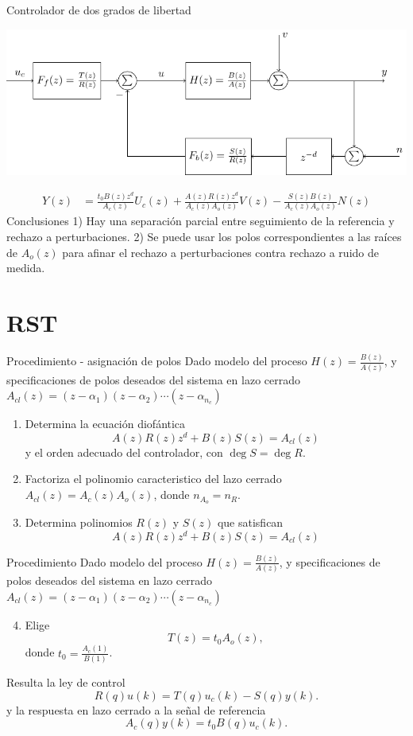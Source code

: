 \documentclass[presentation,aspectratio=169]{beamer}
\begin{document}
\begin{frame}[label={sec:org81875b3}]{Controlador de dos grados de libertad}
\begin{center}
\includegraphics[width=0.7\linewidth]{../../figures/2dof-block-explicit}
\end{center}
\begin{align*}
Y(z) &= \frac{t_0B(z)z^d}{A_c(z)}U_c(z) + \frac{A(z)R(z)z^d}{A_c(z)A_o(z)}V(z)- \frac{S(z)B(z)}{A_c(z)A_o(z)}N(z)
\end{align*}
\alert{Conclusiones} 1) Hay una separación parcial entre seguimiento de la referencia y rechazo a perturbaciones. 2) Se puede usar los polos correspondientes a las raíces de \(A_o(z)\) para afinar el rechazo a perturbaciones contra rechazo a ruido de medida. 
\end{frame}


\section{RST}
\label{sec:org0b1b18a}

\begin{frame}[label={sec:org73508b9}]{Procedimiento - asignación de polos}
Dado modelo del proceso \(H(z)=\frac{B(z)}{A(z)}\), y specificaciones de polos deseados del sistema en lazo cerrado \(A_{cl}(z) = (z-\alpha_1)(z-\alpha_2) \cdots (z-\alpha_{n_c})\)
\begin{enumerate}
\item Determina la ecuación diofántica
\[ A(z)R(z)z^{d} + B(z)S(z) = A_{cl}(z) \]
y el orden adecuado del controlador, con \(\deg S = \deg R\).
\item Factoriza el polinomio caracteristico del lazo cerrado \(A_{cl}(z) = A_c(z)A_o(z)\), donde \(n_{A_o} = n_R\).
\item Determina polinomios \(R(z)\) y \(S(z)\) que satisfican
\[ A(z)R(z)z^{d} + B(z)S(z) = A_{cl}(z) \]
\end{enumerate}
\end{frame}

\begin{frame}[label={sec:org49e5bf6}]{Procedimiento}
Dado modelo del proceso \(H(z)=\frac{B(z)}{A(z)}\), y specificaciones de polos deseados del sistema en lazo cerrado \(A_{cl}(z) = (z-\alpha_1)(z-\alpha_2) \cdots (z-\alpha_{n_c})\)
\begin{enumerate}
\setcounter{enumi}{3}
\item Elige
\[T(z) = t_0 A_o(z),\] donde \(t_0 = \frac{A_c(1)}{B(1)}\).
\end{enumerate}

Resulta la ley de control 
\[ R(q) u(k) = T(q)u_c(k) - S(q)y(k). \]
y la respuesta en lazo cerrado a la señal de referencia
\[ A_c(q)y(k) = t_0 B(q) u_c(k). \]
\end{frame}
\end{document}
